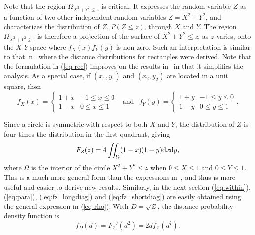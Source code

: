 \documentclass[12pt,draftclsnofoot,onecolumn]{IEEEtran}
\begin{document}
Note that the region $\Omega_{X^2+Y^2 \leq z}$ is critical. It expresses the
random variable $Z$ as a function of two other independent random variables
$Z=X^2+Y^2$, and characterizes the distribution of $Z$, $P(Z\leq z)$, through
$X$ and $Y$. The region $\Omega_{X^2+Y^2 \leq z}$ is therefore a projection
of the surface of $X^2+Y^2 \leq z$, as $z$ varies, onto the
$X$-$Y$ space where $f_X(x)f_Y(y)$ is non-zero.
Such an interpretation is similar to that in~\cite{ghosh1943distribution, ghosh1943random}
where the distance distributions for rectangles were derived.
Note that the formulation in (\ref{eq-rec}) improves on the results
in~\cite{zhuang2011random, zhuang2012geometrical} in that it simplifies the analysis.
As a special case, if $(x_1, y_1)$ and $(x_2, y_2)$ are located
in a unit square, then
\begin{equation}\label{eq:fxy-sqr}
  f_X(x)=\left\{
    \begin{array}{lr}
      1+x & -1\leq x \leq 0 \\
      1-x & 0 \leq x \leq 1
    \end{array}
  \right.
  ~~\mbox{ and }~~ f_Y(y)=\left\{
    \begin{array}{lr}
      1+y & -1\leq y \leq 0 \\
      1-y & 0 \leq y \leq 1
    \end{array}
  \right..
\end{equation}

Since a circle is symmetric with respect to both $X$ and $Y$, the
distribution of $Z$ is four times the distribution in the first quadrant, giving
\begin{equation}\label{eq:f_z1}
F_Z(z)=4\iint_{\Omega}(1-x)(1-y){\rm d}x{\rm d}y,
\end{equation}
where $\Omega$ is the interior of the circle $X^2+Y^2 \leq z$ when $0 \leq X \leq 1$
and $0 \leq Y \leq 1$.
This is a much more general form than the expressions in~\cite{zhuang2011random,
zhuang2012geometrical}, and thus is more useful and easier to derive new results.
Similarly, in the next section (\ref{eq:within}), (\ref{eq:para}), (\ref{eq:fz_longdiag}) and
(\ref{eq:fz_shortdiag}) are easily obtained using the general expression in (\ref{eq-rho}).
With $D=\sqrt{Z}$, the distance probability density function is
\begin{equation}\label{eq:fd-fz}
f_D(d)=F_Z'(d^2)=2df_Z(d^2).
\end{equation}
\end{document}
